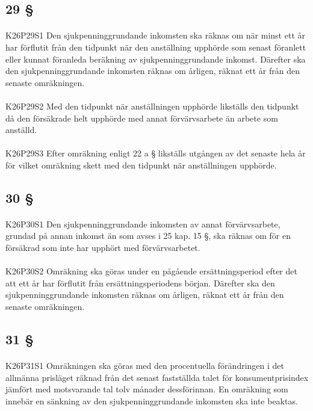 \documentclass[a4paper,notitlepage,openany,10pt]{book}
\begin{document}
\subsection*{29 §}
\paragraph*{}
{\tiny K26P29S1}
Den sjukpenninggrundande inkomsten ska räknas om när minst ett år har förflutit från den tidpunkt när den anställning upphörde som senast föranlett eller kunnat föranleda beräkning av sjukpenninggrundande inkomst. Därefter ska den sjukpenninggrundande inkomsten räknas om årligen, räknat ett år från den senaste omräkningen.
\paragraph*{}
{\tiny K26P29S2}
Med den tidpunkt när anställningen upphörde likställs den tidpunkt då den försäkrade helt upphörde med annat förvärvsarbete än arbete som anställd.
\paragraph*{}
{\tiny K26P29S3}
Efter omräkning enligt 22 a § likställs utgången av det senaste hela år för vilket omräkning skett med den tidpunkt när anställningen upphörde.
\subsection*{30 §}
\paragraph*{}
{\tiny K26P30S1}
Den sjukpenninggrundande inkomsten av annat förvärvsarbete, grundad på annan inkomst än som avses i 25 kap. 15 §, ska räknas om för en försäkrad som inte har upphört med förvärvsarbetet.
\paragraph*{}
{\tiny K26P30S2}
Omräkning ska göras under en pågående ersättningsperiod efter det att ett år har förflutit från ersättningsperiodens början. Därefter ska den sjukpenninggrundande inkomsten räknas om årligen, räknat ett år från den senaste omräkningen.
\subsection*{31 §}
\paragraph*{}
{\tiny K26P31S1}
Omräkningen ska göras med den procentuella förändringen i det allmänna prisläget räknad från det senast fastställda talet för konsumentprisindex jämfört med motsvarande tal tolv månader dessförinnan. En omräkning som innebär en sänkning av den sjukpenninggrundande inkomsten ska inte beaktas.
\end{document}
